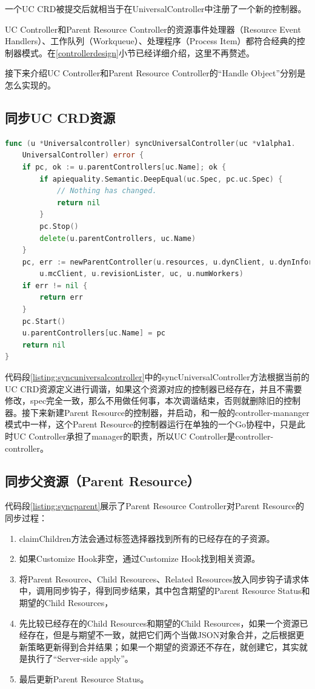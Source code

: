 \documentclass[macfonts,master]{njuthesis}
\begin{document}
一个UC CRD被提交后就相当于在UniversalController中注册了一个新的控制器。

UC Controller和Parent Resource Controller的资源事件处理器（Resource Event Handlers）、工作队列（Workqueue）、处理程序（Process Item）都符合经典的控制器模式。在\ref{controllerdesign}小节已经详细介绍，这里不再赘述。

接下来介绍UC Controller和Parent Resource Controller的“Handle Object”分别是怎么实现的。

\subsection{同步UC CRD资源}
\begin{lstlisting}[language=Go,caption=同步UC CRD,label=listing:syncuniversalcontroller]
func (u *Universalcontroller) syncUniversalController(uc *v1alpha1.
	UniversalController) error {
	if pc, ok := u.parentControllers[uc.Name]; ok {
		if apiequality.Semantic.DeepEqual(uc.Spec, pc.uc.Spec) {
			// Nothing has changed.
			return nil
		}
		pc.Stop()
		delete(u.parentControllers, uc.Name)
	}
	pc, err := newParentController(u.resources, u.dynClient, u.dynInformers, 
		u.mcClient, u.revisionLister, uc, u.numWorkers)
	if err != nil {
		return err
	}
	pc.Start()
	u.parentControllers[uc.Name] = pc
	return nil
}
\end{lstlisting}

代码段\ref{listing:syncuniversalcontroller}中的syncUniversalController方法根据当前的UC CRD资源定义进行调谐，如果这个资源对应的控制器已经存在，并且不需要修改，spec完全一致，那么不用做任何事，本次调谐结束，否则就删除旧的控制器。接下来新建Parent Resource的控制器，并启动，和一般的controller-mananger模式中一样，这个Parent Resource的控制器运行在单独的一个Go协程中，只是此时UC Controller承担了manager的职责，所以UC Controller是controller-controller。

\subsection{同步父资源（Parent Resource）}

代码段\ref{listing:syncparent}展示了Parent Resource Controller对Parent Resource的同步过程：
\begin{enumerate}
	\item claimChildren方法会通过标签选择器找到所有的已经存在的子资源。
	\item 如果Customize Hook非空，通过Customize Hook找到相关资源。
	\item 将Parent Resource、Child Resources、Related Resources放入同步钩子请求体中，调用同步钩子，得到同步结果，其中包含期望的Parent Resource Status和期望的Child Resources，
	\item 先比较已经存在的Child Resources和期望的Child Resources，如果一个资源已经存在，但是与期望不一致，就把它们两个当做JSON对象合并，之后根据更新策略更新得到合并结果；如果一个期望的资源还不存在，就创建它，其实就是执行了“Server-side apply”。
	\item 最后更新Parent Resource Status。
\end{enumerate}
\end{document}
